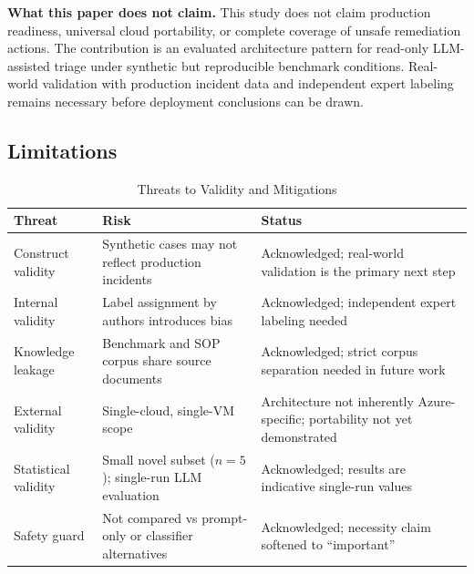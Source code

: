 \documentclass[a4paper,10pt,journal,compsoc]{IEEEtran}
\begin{document}
\textbf{What this paper does not claim.}
This study does not claim production readiness, universal cloud
portability, or complete coverage of unsafe remediation actions. The
contribution is an evaluated architecture pattern for read-only
LLM-assisted triage under synthetic but reproducible benchmark
conditions. Real-world validation with production incident data and
independent expert labeling remains necessary before deployment
conclusions can be drawn.

\subsection{Limitations}
\label{sec:limitations}

\begin{table}[t]
  \caption{Threats to Validity and Mitigations}
  \label{tab:validity}
  \centering
  \begin{tabular}{p{1.8cm}p{2.9cm}p{2.9cm}}
    \hline
    \textbf{Threat} & \textbf{Risk} & \textbf{Status} \\
    \hline
    Construct validity &
      Synthetic cases may not reflect production incidents &
      Acknowledged; real-world validation is the primary next step \\[4pt]
    Internal validity &
      Label assignment by authors introduces bias &
      Acknowledged; independent expert labeling needed \\[4pt]
    Knowledge leakage &
      Benchmark and SOP corpus share source documents &
      Acknowledged; strict corpus separation needed in future work \\[4pt]
    External validity &
      Single-cloud, single-VM scope &
      Architecture not inherently Azure-specific; portability not yet demonstrated \\[4pt]
    Statistical validity &
      Small novel subset ($n=5$); single-run LLM evaluation &
      Acknowledged; results are indicative single-run values \\[4pt]
    Safety guard &
      Not compared vs prompt-only or classifier alternatives &
      Acknowledged; necessity claim softened to ``important'' \\
    \hline
  \end{tabular}
\end{table}
\end{document}
